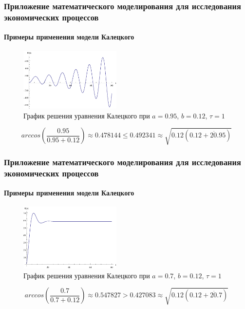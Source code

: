 \documentclass{beamer}
\numberwithin{equation}{section}
\begin{document}
    \begin{frame}
        \frametitle{Приложение математического моделирования для исследования экономических процессов}
        \framesubtitle{Примеры применения модели Калецкого}

        \begin{figure}[h]
            \begin{center}
                \includegraphics[width=0.45\textwidth]{unstable.eps}
            \end{center}
            \caption{График решения уравнения Калецкого при $a=0.95$, $b=0.12$, $\tau=1$}
        \end{figure}

        \begin{equation}\label{eq:Kalecki-stab}
            arccos \left( \frac{0.95}{0.95 + 0.12} \right) \approx 0.478144 \leq 0.492341 \approx \sqrt{0.12 (0.12 + 2 \dot 0.95)}
        \end{equation}

    \end{frame}

    \begin{frame}
        \frametitle{Приложение математического моделирования для исследования экономических процессов}
        \framesubtitle{Примеры применения модели Калецкого}

        \begin{figure}[h]
            \begin{center}
                \includegraphics[width=0.45\textwidth]{stable.eps}
        \end{center}
        \caption{График решения уравнения Калецкого при $a=0.7$, $b=0.12$, $\tau=1$}
    \end{figure}

    \begin{equation}
        arccos \left( \frac{0.7}{0.7 + 0.12} \right) \approx 0.547827 > 0.427083 \approx \sqrt{0.12 (0.12 + 2 \dot 0.7)}
    \end{equation}

    \end{frame}
\end{document}

